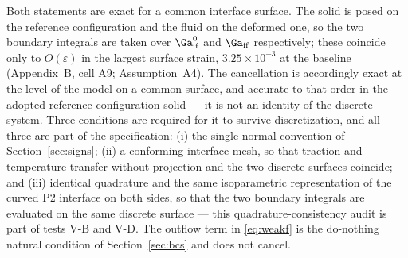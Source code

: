 Both statements are exact for a common interface surface. The solid is posed on the reference
configuration and the fluid on the deformed one, so the two boundary integrals are taken over
$\Ga_{\mathrm{if}}^0$ and $\Ga_{\mathrm{if}}$ respectively; these coincide only to $O(\varepsilon)$
in the largest surface strain, $3.25\times10^{-3}$ at the baseline (Appendix~B, cell A9;
Assumption~A4). The cancellation is accordingly
exact at the level of the model on a common surface, and accurate to that order in the adopted
reference-configuration solid --- it is not an identity of the discrete system. Three conditions are
required for it to survive discretization, and all three are part of the specification: (i) the
single-normal convention of Section~\ref{sec:signs}; (ii) a conforming interface mesh, so that
traction and temperature transfer without projection and the two discrete surfaces coincide; and
(iii) identical quadrature and the same isoparametric representation of the curved P2 interface on
both sides, so that the two boundary integrals are evaluated on the same discrete surface --- this
quadrature-consistency audit is part of tests V-B and V-D. The outflow term in \eqref{eq:weakf} is
the do-nothing natural condition of Section~\ref{sec:bcs} and does not cancel.

